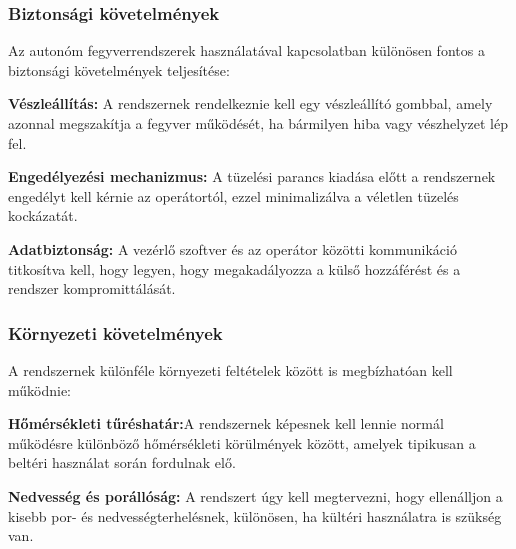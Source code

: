 \subsubsection*{Biztonsági követelmények}

Az autonóm fegyverrendszerek használatával kapcsolatban különösen fontos a biztonsági követelmények teljesítése:

\begin{list}{}{}
	\item \textbf{Vészleállítás:} A rendszernek rendelkeznie kell egy vészleállító gombbal, amely azonnal megszakítja a fegyver működését, ha bármilyen hiba vagy vészhelyzet lép fel.
	\item \textbf{Engedélyezési mechanizmus:} A tüzelési parancs kiadása előtt a rendszernek engedélyt kell kérnie az operátortól, ezzel minimalizálva a véletlen tüzelés kockázatát.
	\item\textbf{ Adatbiztonság:} A vezérlő szoftver és az operátor közötti kommunikáció titkosítva kell, hogy legyen, hogy megakadályozza a külső hozzáférést és a rendszer kompromittálását.
\end{list}

\subsubsection*{Környezeti követelmények}

A rendszernek különféle környezeti feltételek között is megbízhatóan kell működnie:

\begin{list}{}{}
	\item \textbf{Hőmérsékleti tűréshatár:}A rendszernek képesnek kell lennie normál működésre különböző hőmérsékleti körülmények között, amelyek tipikusan a beltéri használat során fordulnak elő.
	\item \textbf{Nedvesség és porállóság:} A rendszert úgy kell megtervezni, hogy ellenálljon a kisebb por- és nedvességterhelésnek, különösen, ha kültéri használatra is szükség van.
\end{list}